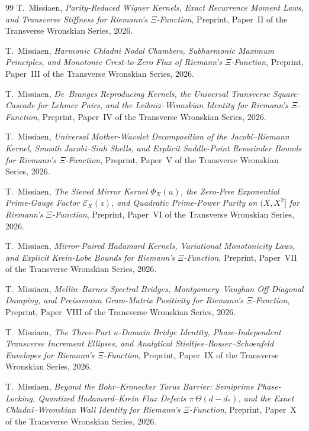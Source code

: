 \documentclass[11pt,reqno]{amsart}
\theoremstyle{definition}
\theoremstyle{remark}
\numberwithin{equation}{section}
\begin{document}
\begin{thebibliography}{99}
T.~Missiaen,
\emph{Parity-Reduced Wigner Kernels, Exact Recurrence Moment Laws, and Transverse Stiffness for Riemann's $\Xi$-Function},
Preprint, Paper~II of the Transverse Wronskian Series, 2026.

T.~Missiaen,
\emph{Harmonic Chladni Nodal Chambers, Subharmonic Maximum Principles, and Monotonic Crest-to-Zero Flux of Riemann's $\Xi$-Function},
Preprint, Paper~III of the Transverse Wronskian Series, 2026.

T.~Missiaen,
\emph{De~Branges Reproducing Kernels, the Universal Transverse Square-Cascade for Lehmer Pairs, and the Leibniz--Wronskian Identity for Riemann's $\Xi$-Function},
Preprint, Paper~IV of the Transverse Wronskian Series, 2026.

T.~Missiaen,
\emph{Universal Mother-Wavelet Decomposition of the Jacobi--Riemann Kernel, Smooth Jacobi--Sinh Shells, and Explicit Saddle-Point Remainder Bounds for Riemann's $\Xi$-Function},
Preprint, Paper~V of the Transverse Wronskian Series, 2026.

T.~Missiaen,
\emph{The Sieved Mirror Kernel $\Phi_X(u)$, the Zero-Free Exponential Prime-Gauge Factor $\mathcal{E}_X(z)$, and Quadratic Prime-Power Purity on $(X, X^2]$ for Riemann's $\Xi$-Function},
Preprint, Paper~VI of the Transverse Wronskian Series, 2026.

T.~Missiaen,
\emph{Mirror-Paired Hadamard Kernels, Variational Monotonicity Laws, and Explicit Krein-Lobe Bounds for Riemann's $\Xi$-Function},
Preprint, Paper~VII of the Transverse Wronskian Series, 2026.

T.~Missiaen,
\emph{Mellin--Barnes Spectral Bridges, Montgomery--Vaughan Off-Diagonal Damping, and Preissmann Gram-Matrix Positivity for Riemann's $\Xi$-Function},
Preprint, Paper~VIII of the Transverse Wronskian Series, 2026.

T.~Missiaen,
\emph{The Three-Part $u$-Domain Bridge Identity, Phase-Independent Transverse Increment Ellipses, and Analytical Stieltjes--Rosser--Schoenfeld Envelopes for Riemann's $\Xi$-Function},
Preprint, Paper~IX of the Transverse Wronskian Series, 2026.

T.~Missiaen,
\emph{Beyond the Bohr--Kronecker Torus Barrier: Semiprime Phase-Locking, Quantized Hadamard--Krein Flux Defects $\pi\,\Theta(d - d_*)$, and the Exact Chladni--Wronskian Wall Identity for Riemann's $\Xi$-Function},
Preprint, Paper~X of the Transverse Wronskian Series, 2026.


\end{thebibliography}
\end{document}
